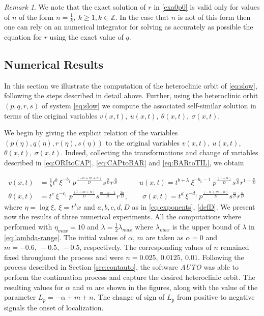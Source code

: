 \documentclass[11pt]{article}
\theoremstyle{remark}
\newtheorem{remark}{Remark}[section]
\begin{document}
\begin{remark}
We note that the exact solution of $r$ in \eqref{exa0p0} is valid only for values of $n$ of the form $n=\frac{1}{k}, \ k\ge 1, k\in\mathbb{Z}$. In the case that $n$ is not of this form then one can rely on an numerical integrator for solving as accurately as possible the equation for $r$ using the exact value of $q$.
\end{remark}


\subsection{Numerical Results}\label{sec:numres}
In this section we illustrate the computation of the heteroclinic orbit of \eqref{eq:slow}, following the steps described in detail above. Further, using the heteroclinic orbit $(p,q,r,s)$ of system \eqref{eq:slow} we compute the associated self-similar solution in terms of the original variables $v(x,t), \ u(x,t),\ \theta(x,t),\ \sigma(x,t)$.

We begin by giving the explicit relation of the variables $(p(\eta),q(\eta),r(\eta),s(\eta))$ to the original variables $v(x,t), \ u(x,t)$, $\theta(x,t),\ \sigma(x,t)$. Indeed, collecting the transformations and change of variables described in \eqref{eq:ORItoCAP}, \eqref{eq:CAPtoBAR} and \eqref{eq:BARtoTIL}, we obtain

\begin{equation}
\label{eq:pqrsTOvugs}
\begin{aligned}
v(x,t) &= \frac{1}{b} t^b\ \xi^{-b_1}\ p^{\frac{(-\alpha+m+n)}{D}} s^{\frac{\alpha}{D}} r^{\frac{n}{D}}\quad\qquad u(x,t) = t^{b+\lambda}\ \xi^{-b_1-1}\ p^{\frac{(1+\alpha)}{D}} s^{\frac{\alpha}{D}} r^{1+\frac{n}{D}} \\
\theta(x,t) &= t^c\ \xi^{-c_1}\ p^{\frac{(1+m+n)}{D}} s^{\frac{m+n-1}{D}} r^{\frac{2n}{D}},\qquad
\sigma(x,t) = t^d\ \xi^{-d_1}\ p^{\frac{(-\alpha+m+n)}{D}} s^{\frac{\alpha}{D}} r^{\frac{n}{D}}
\end{aligned}
\end{equation}
%
where $\eta=\log\xi,\ \xi=t^{\lambda} x$ and $a, b,  c,  d,  D$ as in \eqref{eq:exponents}, \eqref{defD}.   We present now the results of  three numerical experiments. All the computations where performed with $\eta_{max}=10$ and $\lambda = \frac{1}{2}\lambda_{max}$ where $\lambda_{max}$ is the upper bound of $\lambda$ in \eqref{eq:lambda-range}. The initial values of $\alpha$, $m$ are taken as $\alpha=0$ and $m=-0.6, \ -0.5, \ -0.5$, respectively.
The corresponding values of $n$ remained fixed throughout the process and were $n=0.025, \ 0.0125, \ 0.01$.
Following the process  described in Section  \ref{sec:contauto}, the software \emph{AUTO} was able to perform the continuation process
and capture the desired heteroclinic orbit. The resulting values for
$\alpha$ and $m$ are shown in the figures, along with the value of the parameter $L_p = -\alpha + m + n$.  The change of sign of $L_p$ from positive to negative signals the onset of localization.
\end{document}
